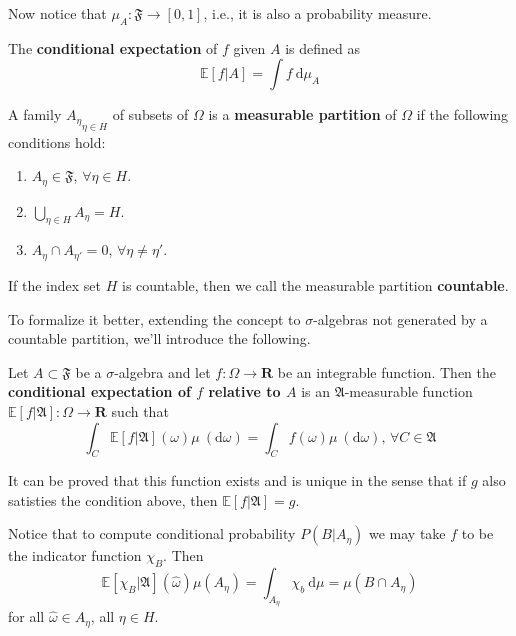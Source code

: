 Now notice that $\mu_A : \mathfrak{F} \longrightarrow [0,1]$, i.e., it is also a probability measure.

\begin{definition}
	The \textbf{conditional expectation} of $f$ given $A$ is defined as 
\[
	\mathbb{E} [f | A] = \int f ~\mathrm{d}\mu_A
\]
\end{definition}

\begin{definition}
	A family ${A_\eta}_{\eta \in H}$ of subsets of $\Omega$ is a \textbf{measurable partition} of $\Omega$ if the following conditions hold:
	\begin{enumerate}
		\item $A_\eta \in \mathfrak{F}$, $\forall \eta \in H$.
		\item $\bigcup_{\eta \in H} A_\eta = H$.
		\item $A_\eta \cap A_{\eta'} = 0$, $\forall \eta \neq \eta'$.
	\end{enumerate}
	If the index set $H$ is countable, then we call the measurable partition \textbf{countable}.
\end{definition}

To formalize it better, extending the concept to $\sigma$-algebras not generated by a countable partition, we'll introduce the following.

\begin{definition}
	Let $A \subset \mathfrak{F}$ be a $\sigma$-algebra and let $f : \Omega \longrightarrow \textbf{R}$ be an integrable function. Then the \textbf{conditional expectation of $f$ relative to $A$} is an $\mathfrak{A}$-measurable function $\mathbb{E}[f | \mathfrak{A}] : \Omega \longrightarrow \textbf{R}$ such that
	\[
		\int_C \mathbb{E}[f | \mathfrak{A}](\omega) \mu ~(\mathrm{d} \omega) = \int_C f(\omega) \mu ~(\mathrm{d} \omega), \, \forall C \in \mathfrak{A}
	\]
\end{definition}

It can be proved that this function exists and is unique in the sense that if $g$ also satisties the condition above, then $\mathbb{E}[f | \mathfrak{A}] = g$.

Notice that to compute conditional probability $P(B | A_\eta)$ we may take $f$ to be the indicator function $\chi_B$. Then
\[
	\mathbb{E}[\chi_B | \mathfrak{A}](\hat{\omega}) \mu(A_\eta) = \int_{A_\eta} \chi_b ~\mathrm{d}\mu = \mu(B \cap A_\eta)
\]
for all $\hat{\omega} \in A_\eta$, all $\eta \in H$.


